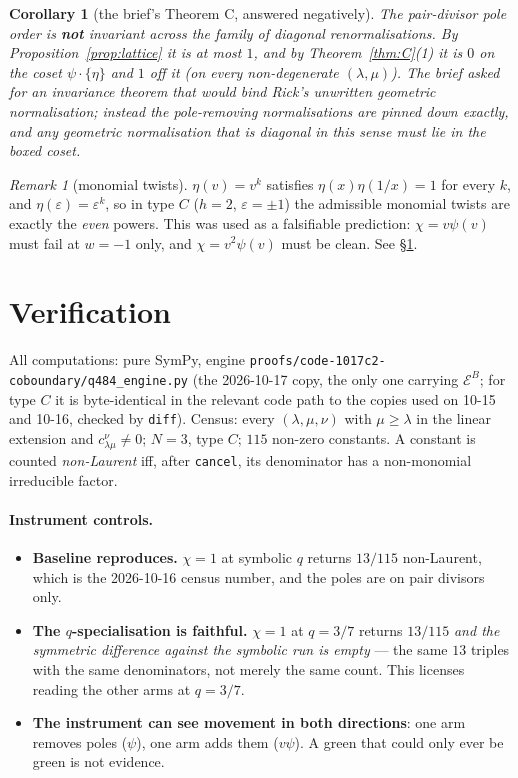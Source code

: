 \documentclass[11pt]{article}
\theoremstyle{plain}
\newtheorem{cor}[thm]{Corollary}
\theoremstyle{definition}
\theoremstyle{remark}
\newtheorem{rem}[thm]{Remark}
\theoremstyle{plain}
\begin{document}
\begin{cor}[the brief's Theorem C, answered negatively]
The pair-divisor pole order is \textbf{not} invariant across the family of diagonal
renormalisations.  By Proposition~\ref{prop:lattice} it is at most $1$, and by
Theorem~\ref{thm:C}(1) it is $0$ on the coset $\psi\cdot\{\eta\}$ and $1$ off it
(on every non-degenerate $(\lambda,\mu)$).  The brief asked for an invariance
theorem that would bind Rick's unwritten geometric normalisation; instead the
pole-removing normalisations are pinned down exactly, and any geometric
normalisation that is diagonal in this sense \emph{must} lie in the boxed coset.
\end{cor}

\begin{rem}[monomial twists]
$\eta(v)=v^{k}$ satisfies $\eta(x)\eta(1/x)=1$ for every $k$, and
$\eta(\varepsilon)=\varepsilon^{k}$, so in type $C$ ($h=2$,
$\varepsilon=\pm1$) the admissible monomial twists are exactly the \emph{even}
powers.  This was used as a falsifiable prediction: $\chi=v\psi(v)$ must fail at
$w=-1$ only, and $\chi=v^2\psi(v)$ must be clean.  See \S\ref{sec:verif}.
\end{rem}

\section{Verification}
\label{sec:verif}

All computations: pure SymPy, engine
\texttt{proofs/code-1017c2-coboundary/q484\_engine.py} (the 2026-10-17 copy, the
only one carrying $\mathcal{E}^B$; for type $C$ it is byte-identical in the
relevant code path to the copies used on 10-15 and 10-16, checked by \texttt{diff}).
Census: every $(\lambda,\mu,\nu)$ with $\mu\ge\lambda$ in the linear extension
and $c^\nu_{\lambda\mu}\ne0$; $N=3$, type $C$; $115$ non-zero constants.
A constant is counted \emph{non-Laurent} iff, after \texttt{cancel}, its
denominator has a non-monomial irreducible factor.

\paragraph{Instrument controls.}
\begin{itemize}
\item \textbf{Baseline reproduces.}  $\chi=1$ at symbolic $q$ returns
  $13/115$ non-Laurent, which is the 2026-10-16 census number, and the poles are
  on pair divisors only.
\item \textbf{The $q$-specialisation is faithful.}  $\chi=1$ at $q=3/7$ returns
  $13/115$ \emph{and the symmetric difference against the symbolic run is
  empty} --- the same $13$ triples with the same denominators, not merely the
  same count.  This licenses reading the other arms at $q=3/7$.
\item \textbf{The instrument can see movement in both directions}: one arm
  removes poles ($\psi$), one arm adds them ($v\psi$).  A green that could only
  ever be green is not evidence.
\end{itemize}
\end{document}
